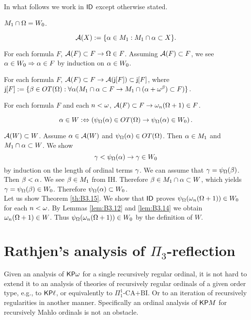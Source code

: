 \documentclass{article}
\begin{document}
In what follows we work in ${\sf ID}$ except otherwise stated.



\blem\label{lem:endext}
$M_{1}\cap\Omega=W_{0}$.

\elem

\[
{\cal A}(X):=\{\alpha\in M_{1}: M_{1}\cap\alpha\subset X\}
.\]

\bprp\label{prp:B3.10}
For each formula $F$,
${\cal A}(F)\subset F \to \Omega\in F$.
\eprp
\bprf
Assuming ${\cal A}(F)\subset F$, we see $\alpha\in W_{0} \Rightarrow \alpha\in F$
by induction on $\alpha\in W_{0}$.
\eprf

\blem\label{lem:B3.11}
For each formula $F$,
${\cal A}(F)\subset F \to {\cal A}({\sf j}[F])\subset{\sf j}[F]$, where
${\sf j}[F]:=
\{\beta\in OT(\Omega): \forall\alpha
(M_{1}\cap\alpha\subset F \to
M_{1}\cap(\alpha+\omega^{\beta})\subset F)\}$.
\elem

\blem\label{lem:B3.12}
For each formula $F$ and {\rm each} $n<\omega$,
${\cal A}(F)\subset F\to \omega_{n}(\Omega+1)\in F$.
\elem



\[
\alpha\in W :\Leftrightarrow 
\left(
\psi_{\Omega}(\alpha)\in OT(\Omega) \to 
\psi_{\Omega}(\alpha)\in W_{0}
\right)
.
\]

\blem\label{lem:B3.14}
${\cal A}(W)\subset W$.
\elem
\bprf
Assume $\alpha\in{\cal A}(W)$ and 
$\psi_{\Omega}(\alpha)\in OT(\Omega)$.
Then $\alpha\in M_{1}$ and $M_{1}\cap\alpha\subset W$.
We show 
\[
\gamma<\psi_{\Omega}(\alpha) \to\gamma\in W_{0}
\]
by induction on the length of ordinal terms $\gamma$.
We can assume that $\gamma=\psi_{\Omega}(\beta)$.
Then $\beta<\alpha$.
We see $\beta\in M_{1}$ from IH.
Therefore $\beta\in M_{1}\cap\alpha\subset W$, which yields
$\gamma=\psi_{\Omega}(\beta)\in W_{0}$.
Therefore
$\psi_{\Omega}(\alpha)\subset W_{0}$.
\eprf
\\

Let us show Theorem \ref{th:B3.15}.
We show that 
${\sf ID}$ proves $\psi_{\Omega}(\omega_{n}(\Omega+1))\in W_{0}$ for each 
$n<\omega$.
By Lemmas \ref{lem:B3.12} and \ref{lem:B3.14} we obtain
$\omega_{n}(\Omega+1)\in W$.
Thus $\psi_{\Omega}(\omega_{n}(\Omega+1))\in W_{0}$ by the definition of $W$.




\section{Rathjen's analysis of $\Pi_{3}$-reflection}\label{sec:pi3}

Given an analysis of ${\sf KP}\omega$ for a single recursively regular ordinal,
it is not hard to extend it to an analysis of theories of recursively regular ordinals of
a given order type, e.g., to ${\sf KP}\ell$, or equivalently to $\Pi^{1}_{1}\mbox{-CA+BI}$.
Or to an iteration of recursively regularities in another manner.
Specifically an ordinal analysis of ${\sf KP}M$ for recursively Mahlo ordinals
is not an obstacle.
\end{document}
